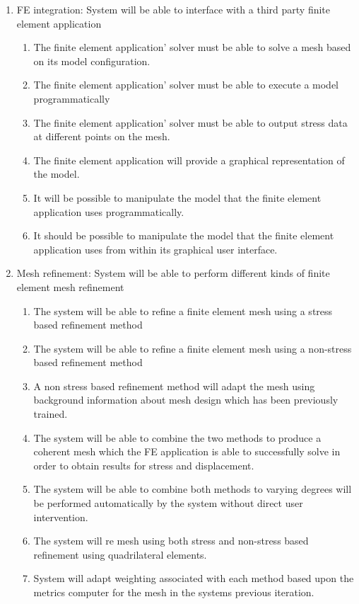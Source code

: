 \documentclass{article}
\begin{document}
\begin{enumerate}
\item FE integration: System will be able to interface with a third party finite element application

\begin{enumerate}
\item The finite element application’ solver must be able to solve a mesh based on its model configuration.
\item The finite element application’ solver must be able to execute a model programmatically
\item The finite element application’ solver must be able to output stress data at different points on the mesh.
\item The finite element application will provide a graphical representation of the model.
\item It will be possible to manipulate the model that the finite element application uses programmatically.
\item It should be possible to manipulate the model that the finite element application uses from within its graphical user interface.
\end{enumerate}

\item Mesh refinement: System will be able to perform different kinds of finite element mesh refinement

\begin{enumerate}
\item The system will be able to refine a finite element mesh using a stress based refinement method
\item The system will be able to refine a finite element mesh using a non-stress based refinement method

\item A non stress based refinement method will adapt the mesh using background information about mesh design which has been previously trained.

\item The system will be able to combine the two methods to produce a coherent mesh which the FE application is able to successfully solve in order to obtain results for stress and displacement.
\item The system will be able to combine both methods to varying degrees will be performed automatically by the system without direct user intervention.
\item The system will re mesh using both stress and non-stress based refinement using quadrilateral elements.
\item System will adapt weighting associated with each method based upon the metrics computer for the mesh in the systems previous iteration.
\end{enumerate}


\end{enumerate}
\end{document}

